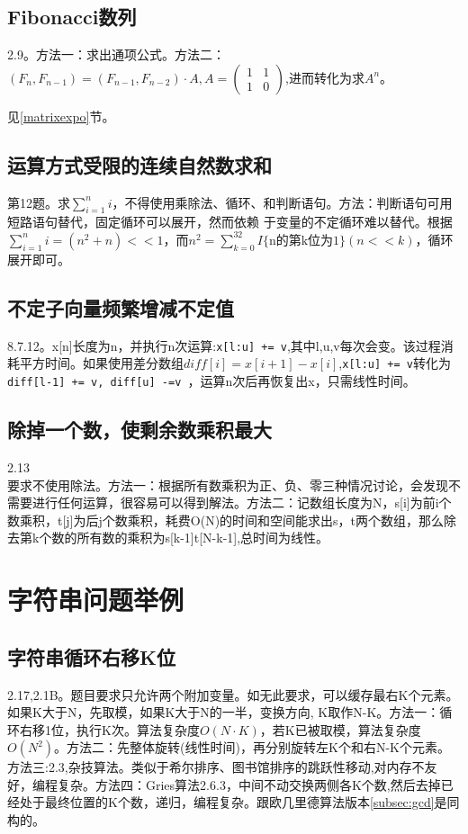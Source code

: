\subsection{Fibonacci数列}
\cite{bop}2.9。方法一：求出通项公式。方法二：$(F_n,F_{n-1})=(F_{n-1},F_{n-2})\cdot A, A=  \left( \begin{array}{cc}1&1\\1&0\end{array}\right)$,进而转化为求$A^n$。

见\ref{matrixexpo}节。



\subsection{运算方式受限的连续自然数求和}
\cite{ms100}第12题。求$ \sum_{i=1}^{n}i $，不得使用乘除法、循环、和判断语句。方法：判断语句可用短路语句替代，固定循环可以展开，然而依赖
于变量的不定循环难以替代。根据$ \sum_{i=1}^{n}i = (n^{2}+n)<<1$，而$n^{2}=\sum_{k=0}^{32}I\{\textrm{n的第k位为1}\}(n<<k)$，循环展开即可。
\subsection{不定子向量频繁增减不定值}
\cite{pp}8.7.12。x[n]长度为n，并执行n次运算:\verb|x[l:u] += v|,其中l,u,v每次会变。该过程消耗平方时间。如果使用差分数组$diff[i]=x[i+1]-x[i]$,\verb|x[l:u] += v|转化为\verb|diff[l-1] += v, diff[u] -=v |，运算n次后再恢复出x，只需线性时间。

\subsection{除掉一个数，使剩余数乘积最大}
\cite{bop}2.13\\
要求不使用除法。方法一：根据所有数乘积为正、负、零三种情况讨论，会发现不需要进行任何运算，很容易可以得到解法。方法二：记数组长度为N，s[i]为前i个数乘积，t[j]为后j个数乘积，耗费O(N)的时间和空间能求出s，t两个数组，那么除去第k个数的所有数的乘积为s[k-1]t[N-k-1],总时间为线性。


\section{字符串问题举例}
\subsection{字符串循环右移K位}
\cite{bop}2.17,\cite{pp}2.1B。题目要求只允许两个附加变量。如无此要求，可以缓存最右K个元素。\\
如果K大于N，先取模，如果K大于N的一半，变换方向, K取作N-K。方法一：循环右移1位，执行K次。算法复杂度$O(N \cdot K)$，若K已被取模，算法复杂度$O(N^2)$。方法二：先整体旋转(线性时间)，再分别旋转左K个和右N-K个元素。方法三:\cite{pp}2.3,杂技算法。类似于希尔排序、图书馆排序的跳跃性移动,对内存不友好，编程复杂。方法四：Gries算法\cite{pp}2.6.3，中间不动交换两侧各K个数,然后去掉已经处于最终位置的K个数，递归，编程复杂。跟欧几里德算法版本\ref{subsec:gcd}是同构的。


